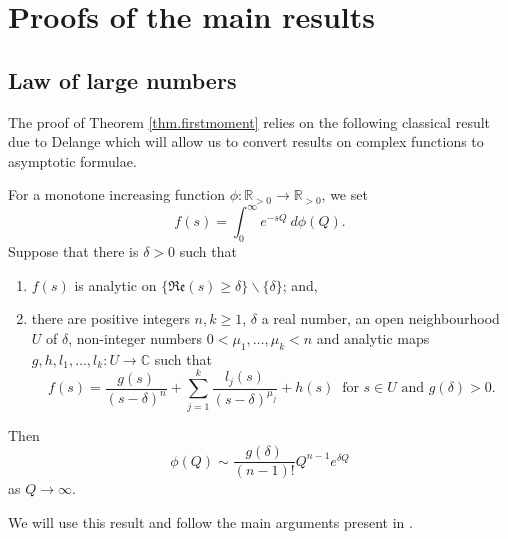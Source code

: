 \documentclass[12pt,a4paper,reqno]{amsart}
\begin{document}
\section{Proofs of the main results}




\subsection{Law of large numbers}\label{subsec:LL}


The proof of Theorem \ref{thm.firstmoment}   relies on the  following classical result due to Delange \cite{delange}  which will allow us to convert results on complex functions to asymptotic formulae. 

\begin{proposition} \label{prop.tau}
For a monotone increasing function $\phi : \mathbb{R}_{>0} \to \mathbb{R}_{>0}$, we set
\[
f(s) = \int_0^{\infty} e^{-sQ} \ d\phi(Q).
\]
Suppose that there is $\delta > 0$ such that
\begin{enumerate}
\item $f(s)$ is analytic on $\{\mathfrak{Re}(s) \ge \delta\} \backslash \{\delta\}$; and,
\item  there are positive integers $n, k  \ge 1$,  $ \delta$ a real  number, an open neighbourhood $U$ of  $\delta$, non-integer numbers $0 < \mu_1, \ldots, \mu_k < n$ and analytic maps $g,h, l_1, \ldots, l_k : U \to \mathbb{C}$ such that
\[
f(s) = \frac{g(s)}{(s-\delta)^n} + \sum_{j=1}^k \frac{l_j(s)}{(s-\delta)^{\mu_j}}+ h(s) \ \text{ for $s \in U$ and  $g(\delta) > 0$}.
\]
\end{enumerate}
Then
\[
\phi(Q) \sim \frac{g(\delta)}{(n-1)!} Q^{n-1} e^{\delta Q}
\]
as $Q\to\infty$.
\end{proposition}

We will use this result and follow the main arguments present in \cite{CanPol2}.
\end{document}
